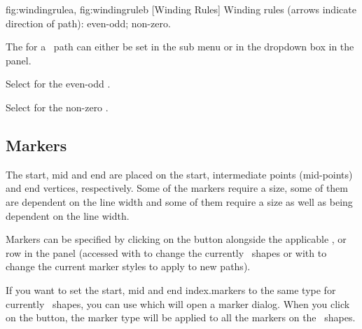 {
 {fig:windingrulea}{}{},
 {fig:windingruleb}{}{}
}
[Winding Rules]
{Winding rules (arrows indicate direction of path):
 even-odd;
 non-zero.}


The  for a \selected\ path can either be set
in the  sub menu or in the
 dropdown box in the
 panel.


Select  for the even-odd 
.


Select  for the non-zero 
.


\subsection{Markers}\label{sec:markers}

The start, mid and end  are placed on
the start, intermediate points (mid-points) and end vertices, respectively. Some of the
markers require a size, some of them are dependent on the line width
and some of them require a size as well as being dependent on the
line width.

Markers can be specified by clicking on the 
button alongside the applicable ,
 or 
row in the  panel (accessed with 
to change the currently \selected\ shapes or with
 to change the current marker styles to apply
to new \glspl{path}).


If you want to set the start, mid and end \glspl{index.marker} to
the same type for currently \selected\ shapes, you can use
 which will open a marker dialog.
When you click on the  button, the marker type
will be applied to all the markers on the \selected\ shapes.

